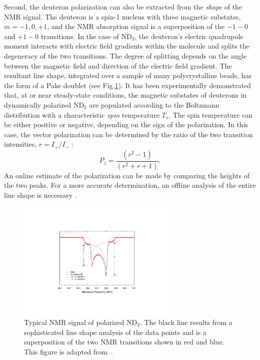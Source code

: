 \documentclass[preprint,12pt]{elsarticle}
\begin{document}
Second, the deuteron polarization can also be extracted from the {\em shape\/} of the NMR signal.  
The deuteron is a spin-1 nucleus with three magnetic substates, $m=\minus1, 0, \plus1$, and the 
NMR absorption signal is a superposition of the $\minus 1-0$ and $\plus 1-0$ transitions.
In the case of ND$_3$, the deuteron's electric quadrupole moment interacts with electric field gradients within the molecule and splits the degeneracy of the two transitions.  The degree of splitting depends on the 
angle between the magnetic field and direction of the electric field gradient.  The resultant line shape, integrated over a sample of many polycrystalline beads, has the form of a Pake doublet (see Fig.\/\ref{NMR}).  
It has been experimentally demonstrated that, at or near steady-state conditions, the magnetic substates of deuterons in dynamically polarized ND$_3$ are populated according to the Boltzmann distribution with a characteristic {\em spin\/} temperature $T_s$.  The spin temperature can be either positive or negative, depending on the sign of the polarization.  In this case, the vector polarization can be determined by the
ratio of the two transition intensities, $r=I_{\plus} / I_{\minus}$ \cite{Dulya1997}:
\begin{equation}
P_z = \frac{(r^2-1)}{(r^2 + r +1)}.
\end{equation}
An online estimate of the polarization can be made by comparing the heights of the two peaks.  
For a more accurate determination, an offline analysis of the entire line shape is necessary \cite{Dulya1997}.

\begin{figure}
\begin{center}
\includegraphics[width=3in]{Stache_NMR.pdf}
\end{center}
\caption{Typical NMR signal of polarized ND$_3$.  The black line results from a sophisticated line shape 
analysis of the data points and is a superposition of the two NMR transitions shown in red and blue.
This figure is adapted from~\cite{Kwaltine2013}.}
\label{NMR}
\end{figure}
\end{document}
